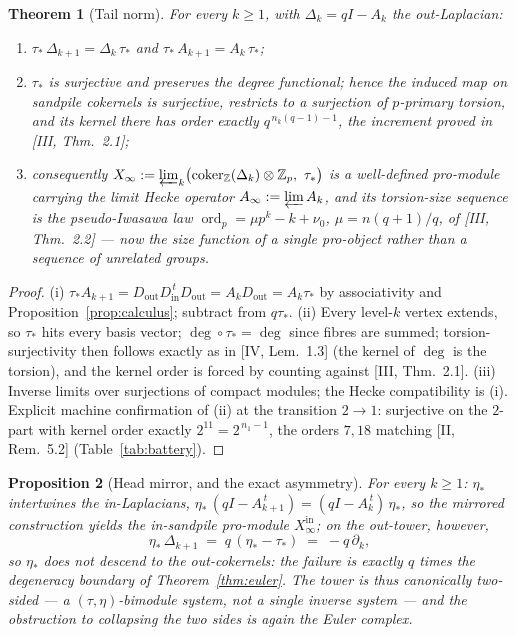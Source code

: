 \documentclass[11pt]{amsart}
\numberwithin{equation}{section}
\newtheorem{theorem}{Theorem}[section]
\newtheorem{proposition}[theorem]{Proposition}
\theoremstyle{definition}
\theoremstyle{remark}
\newcommand{\Z}{\mathbb{Z}}
\newcommand{\Zp}{\Z_p}
\newcommand{\coker}{\operatorname{coker}}
\newcommand{\ord}{\operatorname{ord}}
\newcommand{\ta}{\tau_*}
\newcommand{\et}{\eta_*}
\begin{document}
\begin{theorem}[Tail norm]\label{thm:norm}
For every $k\ge1$, with $\Delta_k=qI-A_k$ the out-Laplacian:
\begin{enumerate}
\item[(i)] $\ta\,\Delta_{k+1}=\Delta_k\,\ta$ and $\ta\,A_{k+1}=A_k\,\ta$;
\item[(ii)] $\ta$ is surjective and preserves the degree functional; hence the
induced map on sandpile cokernels is surjective, restricts to a surjection of
$p$-primary torsion, and its kernel there has order exactly
$q^{\,n_k(q-1)-1}$, the increment proved in {\rm[III, Thm.~2.1]};
\item[(iii)] consequently
$X_\infty:=\varprojlim_k\bigl(\coker_\Z(\Delta_k)\otimes\Zp,\ \ta\bigr)$
is a well-defined pro-module carrying the limit Hecke operator
$A_\infty:=\varprojlim A_k$, and its torsion-size sequence is the pseudo-Iwasawa law
$\ord_p=\mu p^k-k+\nu_0$, $\mu=n(q+1)/q$, of {\rm[III, Thm.~2.2]} --- now the size
function of a single pro-object rather than a sequence of unrelated groups.
\end{enumerate}
\end{theorem}

\begin{proof}
(i) $\ta A_{k+1}=D_{\mathrm{out}}D_{\mathrm{in}}^{\,t}D_{\mathrm{out}}
=A_kD_{\mathrm{out}}=A_k\ta$ by associativity and
Proposition~\ref{prop:calculus}; subtract from $q\ta$. (ii) Every level-$k$ vertex
extends, so $\ta$ hits every basis vector; $\deg\circ\ta=\deg$ since fibres are
summed; torsion-surjectivity then follows exactly as in [IV, Lem.~1.3] (the kernel of
$\deg$ is the torsion), and the kernel order is forced by counting against
[III, Thm.~2.1]. (iii) Inverse limits over surjections of compact modules; the Hecke
compatibility is (i). Explicit machine confirmation of (ii) at the transition
$2\to1$: surjective on the $2$-part with kernel order exactly $2^{11}=2^{\,n_1-1}$,
the orders $7,18$ matching [II, Rem.~5.2] (Table~\ref{tab:battery}).
\end{proof}

\begin{proposition}[Head mirror, and the exact asymmetry]\label{prop:mirror}
For every $k\ge1$: $\et$ intertwines the in-Laplacians,
$\et\,(qI-A_{k+1}^{\,t})=(qI-A_k^{\,t})\,\et$, so the mirrored construction yields the
in-sandpile pro-module $X_\infty^{\mathrm{in}}$; on the out-tower, however,
\[
\et\,\Delta_{k+1}\;=\;q\,(\et-\ta)\;=\;-q\,\partial_k ,
\]
so $\et$ does not descend to the out-cokernels: the failure is exactly $q$ times the
degeneracy boundary of Theorem~\ref{thm:euler}. The tower is thus canonically
two-sided --- a $(\tau,\eta)$-bimodule system, not a single inverse system --- and
the obstruction to collapsing the two sides is again the Euler complex.
\end{proposition}
\end{document}
